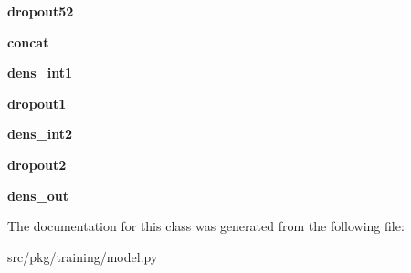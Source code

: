 \begin{DoxyCompactItemize}
{\bfseries dropout52}
\item 
\mbox{\label{classrnb-planning_1_1src_1_1pkg_1_1training_1_1model_1_1_res_net_model_t_p_ad15b3e498ca4884cd1f53d1c01b6676b}} 
{\bfseries concat}
\item 
\mbox{\label{classrnb-planning_1_1src_1_1pkg_1_1training_1_1model_1_1_res_net_model_t_p_a25e76315fcbe9f742910cad26add4696}} 
{\bfseries dens\+\_\+int1}
\item 
\mbox{\label{classrnb-planning_1_1src_1_1pkg_1_1training_1_1model_1_1_res_net_model_t_p_aed9d4146f8ead80a45ecf3d76e8a2ad8}} 
{\bfseries dropout1}
\item 
\mbox{\label{classrnb-planning_1_1src_1_1pkg_1_1training_1_1model_1_1_res_net_model_t_p_aa792fa84a0af3d47be6da264e8294593}} 
{\bfseries dens\+\_\+int2}
\item 
\mbox{\label{classrnb-planning_1_1src_1_1pkg_1_1training_1_1model_1_1_res_net_model_t_p_acaee9701a515a2ba13a3f917a629981a}} 
{\bfseries dropout2}
\item 
\mbox{\label{classrnb-planning_1_1src_1_1pkg_1_1training_1_1model_1_1_res_net_model_t_p_a3bfcca428c494f0f1a85a6955334c972}} 
{\bfseries dens\+\_\+out}
\end{DoxyCompactItemize}


The documentation for this class was generated from the following file\+:\begin{DoxyCompactItemize}
\item 
src/pkg/training/model.\+py\end{DoxyCompactItemize}
